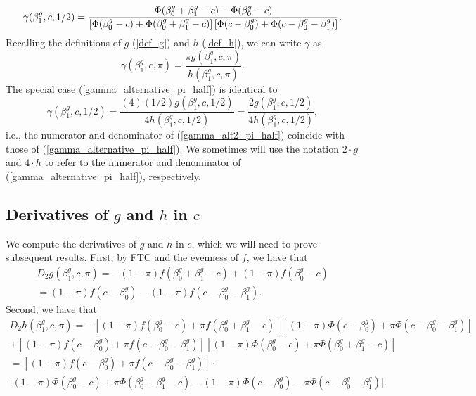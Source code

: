 \documentclass[12pt]{article}
\begin{document}
\begin{appendices}
\begin{refsection}
\begin{equation}
		\gamma(\beta^g_1, c, 1/2)  \\ = \frac{\Phi(\beta_0^g + \beta_1^g - c) - \Phi(\beta_0^g - c) }{\left[\Phi(\beta_0^g - c) +\Phi(\beta^g_0 + \beta^g_1 - c)\right] \left[\Phi(c - \beta^g_0) + \Phi(c - \beta_0^g - \beta_1^g) \right]}.
		\end{equation}
		Recalling the definitions of $g$ (\ref{def_g}) and $h$ (\ref{def_h}), we can write $\gamma$ as
		$$ \gamma(\beta^g_1, c, \pi) = \frac{\pi g(\beta^g_1, c, \pi)}{h(\beta^g_1, c,\pi)}.$$
		The special case (\ref{gamma_alternative_pi_half}) is identical to
		\begin{equation}\label{gamma_alt2_pi_half}
		\gamma(\beta^g_1, c, 1/2) = \frac{(4)(1/2)g(\beta^g_1, c, 1/2)}{4 h(\beta^g_1, c, 1/2)} = \frac{2 g(\beta^g_1, c, 1/2)}{4h(\beta^g_1, c, 1/2)},
		\end{equation}
		i.e., the numerator and denominator of  (\ref{gamma_alt2_pi_half}) coincide with those of (\ref{gamma_alternative_pi_half}). We sometimes will use the notation $2\cdot g$ and $4\cdot h$ to refer to the numerator and denominator of (\ref{gamma_alternative_pi_half}), respectively.
		
		\subsection{Derivatives of  $g$ and $h$ in $c$}\label{sec:derivatives}
		We compute the derivatives of $g$ and $h$ in $c$, which we will need to prove subsequent results. First, by FTC and the evenness of $f$, we have that
		\begin{multline}\label{dg_dc}
		D_2 g(\beta^g_1, c, \pi) = -(1-\pi)f( \beta^g_0 + \beta^g_1 - c ) + (1-\pi) f(\beta^g_0 - c) \\ = (1-\pi) f(c - \beta^g_0) - (1-\pi)f(c - \beta^g_0 - \beta^g_1).
		\end{multline}
		Second, we have that
		\begin{multline}\label{dh_dc}
		D_2 h(\beta^g_1, c, \pi) = -[(1-\pi)f(\beta^g_0 - c) + \pi f( \beta^g_0 + \beta^g_1 - c )]\left[(1-\pi)\Phi(c - \beta^g_0) + \pi \Phi(c - \beta_0^g - \beta_1^g)  \right] \\ + [(1-\pi) f(c - \beta^g_0) +  \pi f(c - \beta^g_0 - \beta^g_1)] \left[(1-\pi) \Phi(\beta_0^g - c) + \pi \Phi(\beta^g_0 + \beta^g_1 - c) \right] \\ = \left[ (1-\pi) f(c - \beta^g_0) +  \pi f(c - \beta^g_0 - \beta^g_1) \right] \cdot \\ \bigg[ (1-\pi) \Phi(\beta_0^g - c) + \pi\Phi(\beta^g_0 + \beta^g_1 - c) - (1-\pi) \Phi(c - \beta^g_0) - \pi \Phi(c - \beta_0^g - \beta_1^g) \bigg].
		\end{multline}
		

\end{refsection}
\end{appendices}
\end{document}

